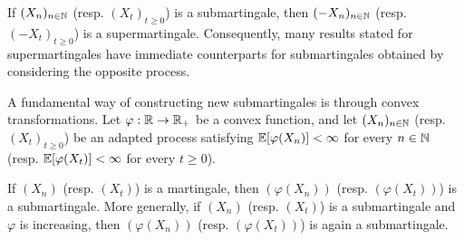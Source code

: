 \documentclass[../Main.tex]{subfiles}
\begin{document}
If $(X_n)_{n \in \mathbb{N}}$ (resp. $(X_t)_{t \ge 0}$) is a submartingale, then
$(-X_n)_{n \in \mathbb{N}}$ (resp. $(-X_t)_{t \ge 0}$) is a supermartingale. Consequently,
many results stated for supermartingales have immediate counterparts for
submartingales obtained by considering the opposite process.

A fundamental way of constructing new submartingales is through convex
transformations. Let
$\varphi:\mathbb{R}\rightarrow\mathbb{R}_{+}$ be a convex function, and let
$(X_n)_{n\in\mathbb{N}}$ (resp. $(X_t)_{t\ge0}$) be an adapted process satisfying
$\mathbb{E}[\varphi(X_n)]<\infty$ for every $n\in\mathbb{N}$
(resp. $\mathbb{E}[\varphi(X_t)]<\infty$ for every $t\ge0$).

If $(X_n)$ (resp. $(X_t)$) is a martingale, then
$(\varphi(X_n))$ (resp. $(\varphi(X_t))$) is a submartingale.
More generally, if $(X_n)$ (resp. $(X_t)$) is a submartingale and
$\varphi$ is increasing, then
$(\varphi(X_n))$ (resp. $(\varphi(X_t))$) is again a submartingale.
\end{document}
